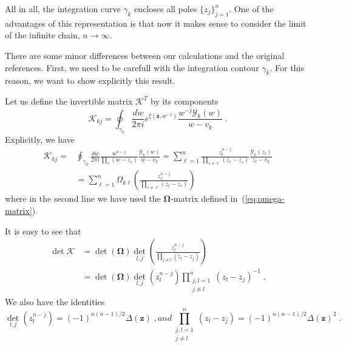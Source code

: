 \documentclass[a4paper,11pt]{amsart}
\begin{document}
All in all, the integration curve \(\gamma_k\) encloses all poles
\(\{z_j\}_{j=1}^n\).  One of the advantages of this representation is
that now it makes sense to consider the limit of the infinite chain,
\(n\to \infty\).

There are some minor differences between our calculations and the
original references. First, we need to be carefull with the
integration contour \(\gamma_k\). For this reason, we want to
show explicitly this result. 

Let us define the invertible matrix \(\bm{\mathcal{K}}^T\) by its components
\begin{equation}
    \mathcal{K}_{kj} = 
\oint_{\gamma_k} \frac{d w}{2\pi i} e^{\xi(\bm{z}, w^{-1})} \frac{w^{-j}\mathcal{Y}_k(w)}{w - v_k}\;. 
\end{equation}
Explicitly, we have 
\begin{equation}
  \begin{split}
    \mathcal{K}_{kj}
    = & \oint_{\gamma_k} \frac{d w}{2\pi i} \frac{w^{n-j}}{\prod_{s} (w - z_s)}
    \frac{\mathcal{Y}_k(w)}{w - v_k} = \sum_{\ell =1}^n \frac{z_l^{n-j}}{\prod_{s\neq \ell} (z_\ell - z_s)}
    \frac{\mathcal{Y}_k(z_\ell)}{z_\ell - v_k}\\
    & = \sum_{\ell = 1}^n  \Omega_{k \ell} \left( \frac{z_\ell^{n-j}}{\prod_{s\neq \ell} (z_\ell - z_s)} \right)
  \end{split}
\end{equation}
where in the second line we have used the \(\bm{\Omega}\)-matrix
defined in~(\ref{eq:omega-matrix}).

It is easy to see that
\begin{equation}
  \begin{split}
  \det \bm{\mathcal{K}} & = \det(\bm{\Omega}) \det_{l,j}\left( \frac{z_l^{n-j}}{\prod_{j\neq l} (z_l - z_j)}\right) \\
  & = \det(\bm{\Omega}) \det_{l, j}(z_l^{n-j}) \prod_{\substack{j, l =1 \\ j \neq l}}^n (z_l - z_j)^{-1} \; .
  \end{split}
\end{equation}
We also have the identities 
\begin{subequations}
  \begin{equation}
	\det_{l,j}(z_l^{n-j}) = (-1)^{n(n-1)/2} \Delta(\bm{z})\; ,
  \end{equation}
  and
  \begin{equation}
	\prod_{\substack{j, l = 1 \\ j \neq l}}^n (z_l - z_j) = (-1)^{n(n-1)/2} \Delta(\bm{z})^2\; . 
  \end{equation}
\end{subequations}
\end{document}
